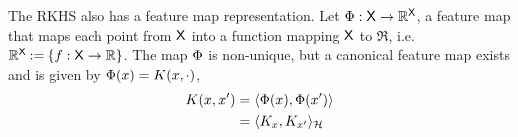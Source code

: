 The RKHS also has a feature map representation. Let $\Phi: {\sf X} \to \mathbb{R}^{\sf X}$, a feature map that maps each point from ${\sf X}$ into a function mapping ${\sf X}$ to $\Re$, i.e. $\mathbb{R}^{\sf X} \mathbin{:=} \{f: {\sf X} \to \mathbb{R} \}$. The map $\Phi$ is non-unique, but a canonical feature map exists and is given by $\Phi(x)  =  K(x,\cdot)$, %
\begin{equation}
\begin{aligned}
\Kern(x,x') &= \langle \featuremap(x), \featuremap(x')\rangle \\
& = \langle \Kern_x, \Kern_{x'} \rangle_\clH
\end{aligned}
\label{e:rkhs_feature_map}
\end{equation}

%
%

